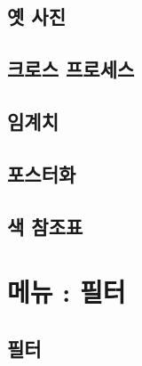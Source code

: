 \documentclass[12pt, a4paper, oneside]{book}
\let\stdsection\section
\renewcommand\section{\newpage\stdsection}
\begin{document}
\section{	옛 사진				}							
\section{	크로스 프로세스				}							
\section{	임계치				}							
\section{	포스터화				}							
\section{	색 참조표				}							



										
	\chapter{메뉴 : 필터} 
	\minitoc
	\section{	필터	}

																		
\end{document}
